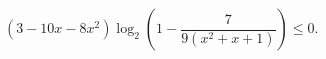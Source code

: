 \begin{ex}[type=inequality]
	\begin{condition}
		$ (3 - 10x - 8x^2)\log_2\left(1 - \dfrac{7}{9(x^2 + x + 1)}\right)\leqslant0 .$
	\end{condition}
\end{ex}
